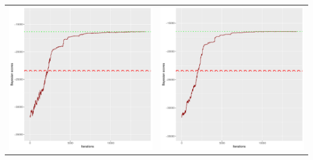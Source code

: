 \documentclass[]{scrartcl}
\begin{document}
\begin{table}[h!]
\begin{tabular}{cc}
\includegraphics[scale = 0.4]{./figs/win95pts/v3/25/bayBoundsEvolution-14252.pdf} & 
\includegraphics[scale = 0.4]{./figs/win95pts/v3/50/bayBoundsEvolution-14252.pdf} \\

\end{tabular}
\end{table}
\end{document}
